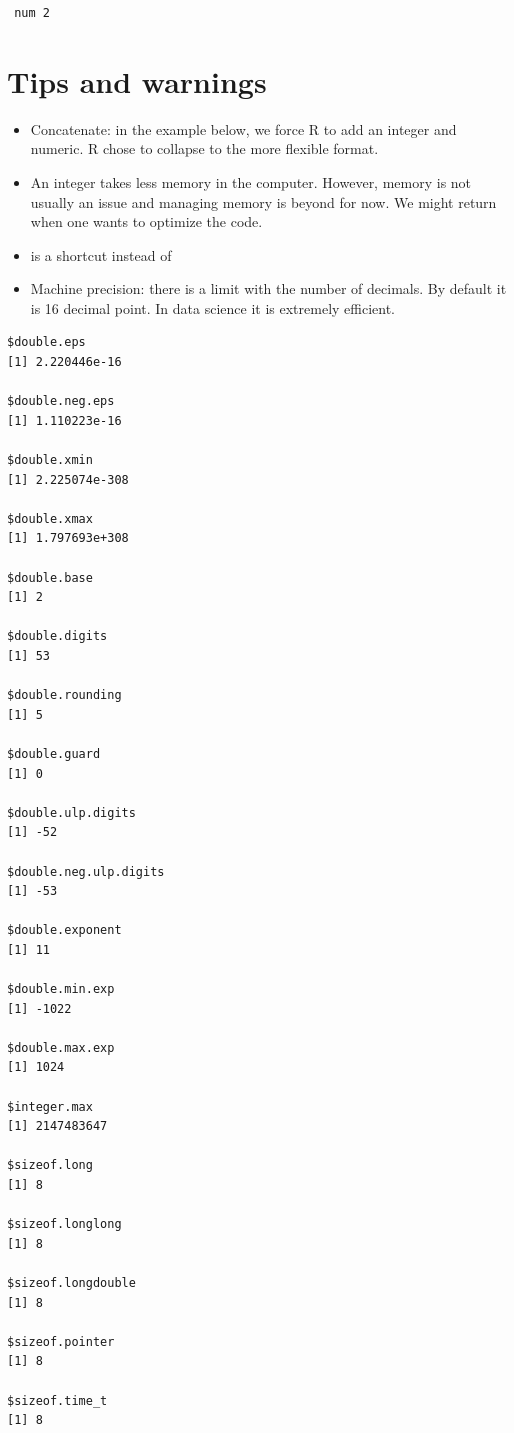 \documentclass[
  letterpaper,
  DIV=11,
  numbers=noendperiod]{scrreprt}
\begin{document}
\begin{verbatim}
 num 2
\end{verbatim}

\section*{Tips and warnings}\label{tips-and-warnings-22}


\begin{itemize}
\item
  Concatenate: in the example below, we force R to add an integer and
  numeric. R chose to collapse to the more flexible format.
\item
  An integer takes less memory in the computer. However, memory is not
  usually an issue and managing memory is beyond for now. We might
  return when one wants to optimize the code.
\item
  is a shortcut instead of
\item
  Machine precision: there is a limit with the number of decimals. By
  default it is 16 decimal point. In data science it is extremely
  efficient.
\end{itemize}

\begin{verbatim}
$double.eps
[1] 2.220446e-16

$double.neg.eps
[1] 1.110223e-16

$double.xmin
[1] 2.225074e-308

$double.xmax
[1] 1.797693e+308

$double.base
[1] 2

$double.digits
[1] 53

$double.rounding
[1] 5

$double.guard
[1] 0

$double.ulp.digits
[1] -52

$double.neg.ulp.digits
[1] -53

$double.exponent
[1] 11

$double.min.exp
[1] -1022

$double.max.exp
[1] 1024

$integer.max
[1] 2147483647

$sizeof.long
[1] 8

$sizeof.longlong
[1] 8

$sizeof.longdouble
[1] 8

$sizeof.pointer
[1] 8

$sizeof.time_t
[1] 8
\end{verbatim}
\end{document}

